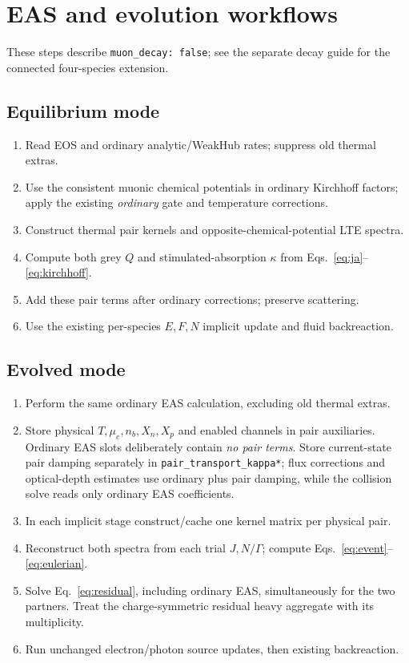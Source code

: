 \documentclass[11pt,a4paper]{article}
\newcommand{\code}[1]{\texttt{#1}}
\begin{document}
\section{EAS and evolution workflows}

These steps describe \code{muon\_decay: false}; see the separate decay guide
for the connected four-species extension.

\subsection{Equilibrium mode}
\begin{enumerate}
\item Read EOS and ordinary analytic/WeakHub rates; suppress old thermal extras.
\item Use the consistent muonic chemical potentials in ordinary Kirchhoff
  factors; apply the existing \emph{ordinary} gate and temperature corrections.
\item Construct thermal pair kernels and opposite-chemical-potential LTE spectra.
\item Compute both grey $Q$ and stimulated-absorption $\kappa$ from
  Eqs.~\eqref{eq:ja}--\eqref{eq:kirchhoff}.
\item Add these pair terms after ordinary corrections; preserve scattering.
\item Use the existing per-species $E,F,N$ implicit update and fluid backreaction.
\end{enumerate}

\subsection{Evolved mode}
\begin{enumerate}
\item Perform the same ordinary EAS calculation, excluding old thermal extras.
\item Store physical $T,\mu_e,n_b,X_n,X_p$ and enabled channels in pair
  auxiliaries. Ordinary EAS slots deliberately contain \emph{no pair terms}.
  Store current-state pair damping separately in \code{pair\_transport\_kappa*};
  flux corrections and optical-depth estimates use ordinary plus pair damping,
  while the collision solve reads only ordinary EAS coefficients.
\item In each implicit stage construct/cache one kernel matrix per physical pair.
\item Reconstruct both spectra from each trial $J,N/\Gamma$; compute
  Eqs.~\eqref{eq:event}--\eqref{eq:eulerian}.
\item Solve Eq.~\eqref{eq:residual}, including ordinary EAS, simultaneously
  for the two partners. Treat the charge-symmetric residual heavy aggregate
  with its multiplicity.
\item Run unchanged electron/photon source updates, then existing backreaction.
\end{enumerate}
\end{document}
